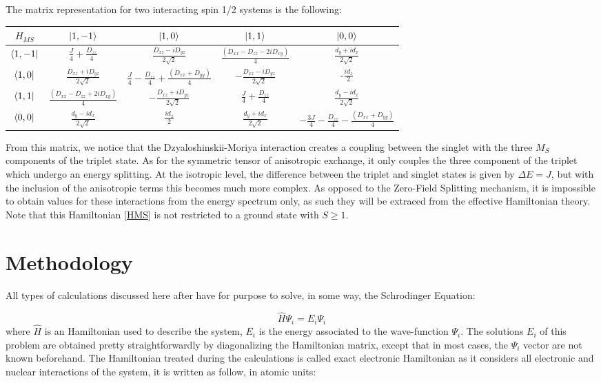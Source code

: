 \documentclass[10pt]{report}
\numberwithin{equation}{section}
\begin{document}
The matrix representation for two interacting spin 1/2 systems is the following:
\begin{center}
    \begin{tabular}{c | c c c c}
        $H_{MS}$ & $\ket{1,-1}$ & $\ket{1,0}$ & $\ket{1,1}$ & $\ket{0,0}$\\
        \hline
        $\bra{1,-1}$ & $\frac{J}{4}+\frac{D_{zz}}{4}$ & $\frac{D_{xz}-iD_{yz}}{2\sqrt{2}}$ & $\frac{(D_{xx}-D_{zz}-2iD_{xy})}{4} $& $\frac{d_y+id_x}{2\sqrt{2}}$\\
        $\bra{1,0}$ & $\frac{D_{xz}+iD_{yz}}{2\sqrt{2}}$ &$ \frac{J}{4} -\frac{D_{zz}}{4} +\frac{(D_{xx}+D_{yy})}{4}$& $-\frac{D_{xz}-iD_{yz}}{2\sqrt{2}}$ & -$\frac{id_z}{2}$ \\
        $\bra{1,1}$ &$\frac{(D_{xx}-D_{zz}+2iD_{xy})}{4} $ & $-\frac{D_{xz}+iD_{yz}}{2\sqrt{2}}$ & $\frac{J}{4}+\frac{D_{zz}}{4}$ & $\frac{d_y-id_x}{2\sqrt{2}}$\\
        $\bra{0,0}$ & $\frac{d_y-id_x}{2\sqrt{2}}$  & $\frac{id_z}{2}$  &$\frac{d_y+id_x}{2\sqrt{2}}$  & $-\frac{3J}{4}-\frac{D_{zz}}{4}-\frac{(D_{xx}+D_{yy})}{4}$\\
    \end{tabular}
\end{center}
From this matrix, we notice that the Dzyaloshinskii-Moriya interaction creates a coupling between the singlet with the three $M_S$ components of the triplet state.
As for the symmetric tensor of anisotropic exchange, it only couples the three component of the triplet which undergo an energy splitting.
At the isotropic level, the difference between the triplet and singlet states is given by $\Delta E=J$, but with the inclusion of the anisotropic terms this becomes much more complex. 
As opposed to the Zero-Field Splitting mechanism, it is impossible to obtain values for these interactions from the energy spectrum only, as such they will be extraced from the effective Hamiltonian theory.
Note that this Hamiltonian \ref{HMS} is not restricted to a ground state with $S\ge1$.

\section{Methodology}

All types of calculations discussed here after have for purpose to solve, in some way, the Schrodinger Equation:

\begin{equation}
    \hat{H}\Psi_i=E_i\Psi_i
\end{equation}
where $\hat{H}$ is an Hamiltonian used to describe the system, $E_i$ is the energy associated to the wave-function $\Psi_i$. 
The solutions $E_i$ of this problem are obtained pretty straightforwardly by diagonalizing the Hamiltonian matrix, except that in most cases, the $\Psi_i$ vector are not known beforehand.
The Hamiltonian treated during the calculations is called exact electronic Hamiltonian as it considers all electronic and nuclear interactions of the system, it is written as follow, in atomic units:
\end{document}
